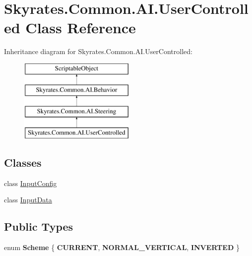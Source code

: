 \hypertarget{class_skyrates_1_1_common_1_1_a_i_1_1_user_controlled}{\section{Skyrates.\-Common.\-A\-I.\-User\-Controlled Class Reference}
\label{class_skyrates_1_1_common_1_1_a_i_1_1_user_controlled}
}
Inheritance diagram for Skyrates.\-Common.\-A\-I.\-User\-Controlled\-:\begin{figure}[H]
\begin{center}
\leavevmode
\includegraphics[height=4.000000cm]{class_skyrates_1_1_common_1_1_a_i_1_1_user_controlled}
\end{center}
\end{figure}
\subsection*{Classes}
\begin{DoxyCompactItemize}
\item 
class \hyperlink{class_skyrates_1_1_common_1_1_a_i_1_1_user_controlled_1_1_input_config}{Input\-Config}
\item 
class \hyperlink{class_skyrates_1_1_common_1_1_a_i_1_1_user_controlled_1_1_input_data}{Input\-Data}
\end{DoxyCompactItemize}
\subsection*{Public Types}
\begin{DoxyCompactItemize}
\item 
enum {\bfseries Scheme} \{ {\bfseries C\-U\-R\-R\-E\-N\-T}, 
{\bfseries N\-O\-R\-M\-A\-L\-\_\-\-V\-E\-R\-T\-I\-C\-A\-L}, 
{\bfseries I\-N\-V\-E\-R\-T\-E\-D}
 \}
\end{DoxyCompactItemize}
